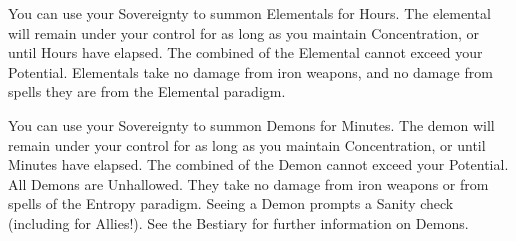 {


You can use your Sovereignty to summon Elementals for Hours.  The elemental will remain under your control for as long as you maintain Concentration, or until Hours have elapsed.  The combined \HD of the Elemental cannot exceed your Potential.  Elementals take no damage from iron weapons, and no damage from spells   they are from the Elemental paradigm.


\cbreak


You can use your Sovereignty to summon Demons for Minutes.  The demon will remain under your control for as long as you maintain Concentration, or until Minutes have elapsed. The combined \HD of the Demon cannot exceed your Potential.  All Demons are Unhallowed. They take no damage from iron weapons or from spells   of the Entropy paradigm. Seeing a Demon prompts a Sanity check (including for Allies!).  See the Bestiary for further information on Demons.

}
